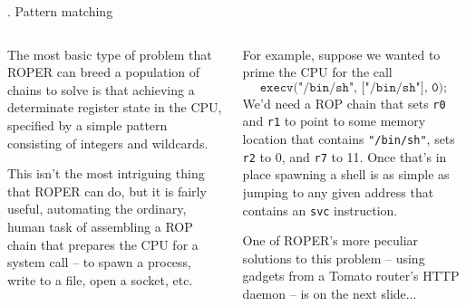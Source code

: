 \documentclass[9pt]{beamer}
\begin{document}
\begin{frame}[t]{\theframenumber. Pattern matching}
  \begin{columns}
    \begin{column}{.5\textwidth}
      The most basic type of problem that ROPER can breed a population of chains to solve is that achieving a determinate register state in the CPU, specified by a simple pattern consisting of integers and wildcards.
      \vspace{8pt}

      This isn't the most intriguing thing that ROPER can do, but it is fairly useful, automating the ordinary, human task of assembling a ROP chain that prepares the CPU for a system call -- to spawn a process, write to a file, open a socket, etc.
    \end{column}
    \begin{column}{.5\textwidth}
      For example, suppose we wanted to prime the CPU for the call
      $$\texttt{execv("/bin/sh", ["/bin/sh"], 0);}$$
      We'd need a ROP chain that sets \texttt{r0} and \texttt{r1} to point to some memory location that contains \texttt{"/bin/sh"}, sets \texttt{r2} to 0, and \texttt{r7} to 11. Once that's in place spawning a shell is as simple as jumping to any given address that contains an \texttt{svc} instruction.
      \vspace{8pt}

      One of ROPER's more peculiar solutions to this problem -- using gadgets from a Tomato router's HTTP daemon -- is on the next slide...
    \end{column}
  \end{columns}
\end{frame}
\end{document}
